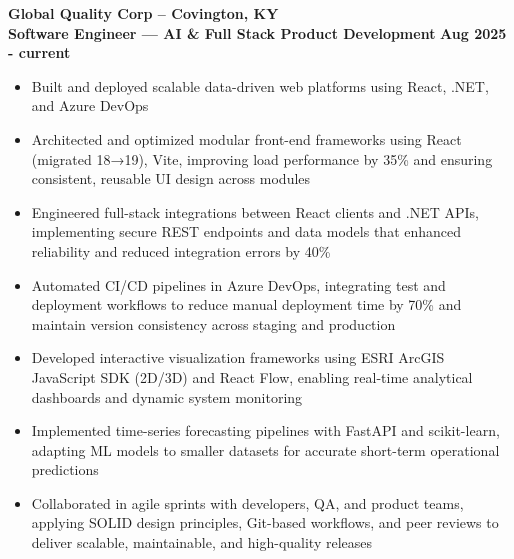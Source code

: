 \documentclass[a4paper,10pt]{article}
\begin{document}
\textbf{Global Quality Corp – Covington, KY} \\[3.75pt]
\textbf{Software Engineer — AI \& Full Stack Product Development} \hfill \textbf{Aug 2025 - current} \\[3.75pt]
\begin{minipage}[t]{\linewidth}
\begin{itemize}[nosep,after=\strut, leftmargin=1em, itemsep=3pt,label=$\bullet$]
\item Built and deployed scalable data-driven web platforms using React, .NET, and Azure DevOps
\item Architected and optimized modular front-end frameworks using React (migrated 18→19), Vite, improving load performance by 35\% and ensuring consistent, reusable UI design across modules
\item Engineered full-stack integrations between React clients and .NET APIs, implementing secure REST endpoints and data models that enhanced reliability and reduced integration errors by 40\%
\item Automated CI/CD pipelines in Azure DevOps, integrating test and deployment workflows to reduce manual deployment time by 70\% and maintain version consistency across staging and production
\item Developed interactive visualization frameworks using ESRI ArcGIS JavaScript SDK (2D/3D) and React Flow, enabling real-time analytical dashboards and dynamic system monitoring
\item Implemented time-series forecasting pipelines with FastAPI and scikit-learn, adapting ML models to smaller datasets for accurate short-term operational predictions
\item Collaborated in agile sprints with developers, QA, and product teams, applying SOLID design principles, Git-based workflows, and peer reviews to deliver scalable, maintainable, and high-quality releases
\end{itemize}
\end{minipage}
\end{document}

